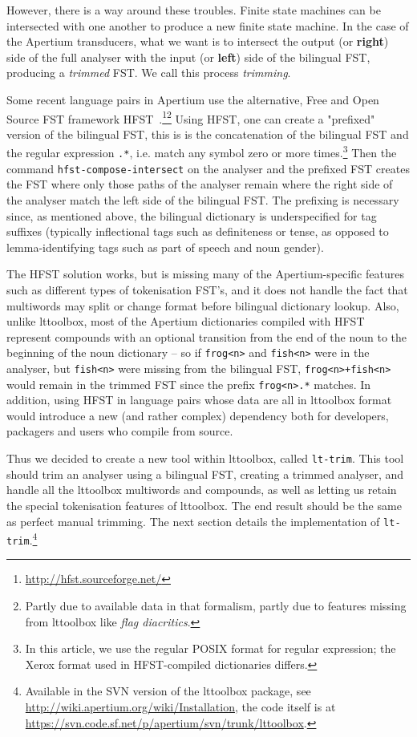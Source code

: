 \documentclass[10pt, a4paper]{article}
\newcommand{\ana}[1]{\texttt{#1}}
\newcommand{\tool}[1]{\texttt{#1}}
\begin{document}
However, there is a way around these troubles. Finite state machines
can be intersected with one another to produce a new finite state
machine. In the case of the Apertium transducers, what we want is to
intersect the output (or \textbf{right}) side of the full analyser
with the input (or \textbf{left}) side of the bilingual FST, producing
a \emph{trimmed} FST. We call this process \emph{trimming}.

Some recent language pairs in Apertium use the alternative, Free and
Open Source FST framework
HFST~\cite{linden2011hfst}.\footnote{\url{http://hfst.sourceforge.net/}}\footnote{Partly
  due to available data in that formalism, partly due to features
  missing from lttoolbox like \emph{flag diacritics}.} Using HFST, one
can create a "prefixed" version of the bilingual FST, this is is the
concatenation of the bilingual FST and the regular expression
\ana{.*}, i.e. match any symbol zero or more times.\footnote{In this
  article, we use the regular POSIX format for regular expression; the
  Xerox format used in HFST-compiled dictionaries differs.} Then the
command \tool{hfst-compose-intersect} on the analyser and the prefixed
FST creates the FST where only those paths of the analyser remain
where the right side of the analyser match the left side of the
bilingual FST. The prefixing is necessary since, as mentioned above,
the bilingual dictionary is underspecified for tag suffixes (typically
inflectional tags such as definiteness or tense, as opposed to
lemma-identifying tags such as part of speech and noun gender).

The HFST solution works, but is missing many of the Apertium-specific
features such as different types of tokenisation FST's, and it does
not handle the fact that multiwords may split or change format before
bilingual dictionary lookup. Also, unlike lttoolbox, most of the
Apertium dictionaries compiled with HFST represent compounds with an
optional transition from the end of the noun to the beginning of the
noun dictionary -- so if \ana{frog<n>} and \ana{fish<n>} were in the
analyser, but \ana{fish<n>} were missing from the bilingual FST,
\ana{frog<n>+fish<n>} would remain in the trimmed FST since the prefix
\ana{frog<n>.*} matches. In addition, using HFST in language pairs
whose data are all in lttoolbox format would introduce a new (and
rather complex) dependency both for developers, packagers and users
who compile from source.

Thus we decided to create a new tool within lttoolbox, called
\tool{lt-trim}. This tool should trim an analyser using a bilingual
FST, creating a trimmed analyser, and handle all the lttoolbox
multiwords and compounds, as well as letting us retain the special
tokenisation features of lttoolbox. The end result should be the same
as perfect manual trimming. The next section details the
implementation of \tool{lt-trim}.\footnote{Available in the SVN
  version of the lttoolbox package, see
  \url{http://wiki.apertium.org/wiki/Installation},
  the code itself is at
  \url{https://svn.code.sf.net/p/apertium/svn/trunk/lttoolbox}.}
\end{document}
